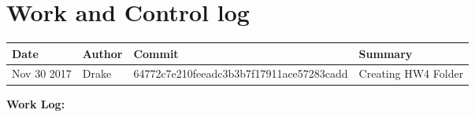\documentclass[onecolumn, draftclsnofoot,10pt, compsoc]{IEEEtran}
\begin{document}
\section{Work and Control log}
\begin{center}
    \begin{tabular}{| p{2.5cm} | l | l | p{3cm} |}    
    	\hline
        Date & Author & Commit & Summary \\ \hline
        Nov 30 2017 & Drake & 64772c7e210feeadc3b3b7f17911ace57283cadd & Creating HW4 Folder \\ \hline    	
	\end{tabular}
\linebreak

\textbf{Work Log:}  
\end{center}
 
\end{document}
